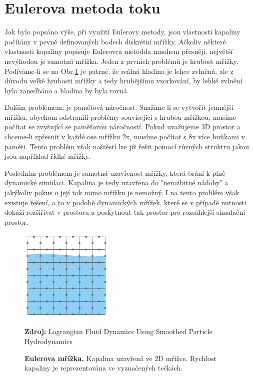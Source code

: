 \section{Eulerova metoda toku}
Jak bylo popsáno výše, při využití Eulerovy metody, jsou vlastnosti kapaliny počítány v pevně definovaných bodech diskrétní mřížky. Ačkoliv některé vlastnosti kapaliny popisuje Eulerovca metodda mnohem přesněji, největší nevýhodou je samotná mřížka. Jeden z prvních problémů je hrubost mřížky. Podíváme-li se na Obr.\ref{fig:EulerGrid} je patrné, že reálná hladina je lehce zvlněná, ale z důvodu velké hrubosti mřížky a tedy hrubějšímu vzorkování, by lehké zvlnění bylo zanedbáno a hladina by byla rovná. 

Dalším problémem, je paměťová náročnost. Snažíme-li se vytvořit jemnější mřížku, abychom odstranili problémy související s hrubou mřížkou, musíme počítat se zvyšující se paměťovou náročností. Pokud uvažujeme 3D prostor a chceme-li zpřesnit v každé ose mřížku 2x, musíme počítat s 8x více buňkami v paměti. Tento problém však naštěstí lze již řešit pomocí různých struktru jakou jsou například řídké mřížky.

Posledním problémem je samotná uzavřenost mřížky, která brání k plně dynamické simulaci. Kapalina je tedy uzavřena do "nerozbitné nádoby" a jakýkoliv pokus o její tok mimo mřížku je nemožný. I na tento problém však existuje řešení, a to v podobě dynamických mřížek, které se v případě nutnosti dokáží rozšiřivat v prostoru a poskytnout tak prostor pro rozsáhlejší simulační prostor.
\cite{KelagerSPH} 

\begin{figure}[hbt]
	\centering
	\captionsetup{justification=centering}
	\includegraphics[width=0.4\textwidth]{obrazky-figures/GridEuler.PNG}
	\caption{\textbf{Eulerova mřížka.} Kapalina uzavřená ve 2D mřížce. Rychlost kapaliny je reprezentována ve vyznačených tečkách.}
	\textbf{Zdroj: } Lagrangian Fluid Dynamics Using Smoothed Particle Hydrodynamics \cite{KelagerSPH}
	\label{fig:EulerGrid}
\end{figure}

